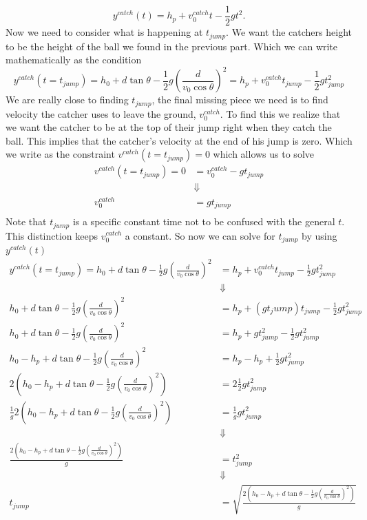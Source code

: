 \documentclass[11pt]{article}
\begin{document}
\begin{equation}
y^{catch}(t) = h_p + v^{catch}_0t - \frac{1}{2}gt^2.
\label{YCatch}
\end{equation}
Now we need to consider what is happening at $t_{jump}$. We want the catchers height to be 
the height of the ball we found in the previous part. Which we can write mathematically as 
the condition
$$y^{catch}(t=t_{jump}) = h_0 + d\tan\theta - \frac{1}{2}g\left(\frac{d}{v_0\cos\theta}\right)^2  = h_p + v^{catch}_0t_{jump} - \frac{1}{2}gt_{jump}^2$$
We are really close to finding $t_{jump}$, the final missing piece we need is to find 
velocity the catcher uses to leave the ground, $v^{catch}_0$. To find this we realize that 
we want the catcher to be at the top of their jump right when they catch the ball. This 
implies that the catcher's velocity at the end of his jump is zero. Which we write as the 
constraint $v^{catch}(t=t_{jump}) = 0$ which allows us to solve
\begin{align*}
v^{catch}(t=t_{jump}) = 0 &= v^{catch}_0 - gt_{jump}\\
&\Downarrow\\
v^{catch}_0 &= gt_{jump}\\
\end{align*}
Note that $t_{jump}$ is a specific constant time not to be confused with the general $t$. 
This distinction keeps $v^{catch}_0$ a constant. So now we can solve for $t_{jump}$ by 
using $y^{catch}(t)$
\begin{align*}
y^{catch}(t=t_{jump}) = h_0 + d\tan\theta - \frac{1}{2}g\left(\frac{d}{v_0\cos\theta}\right)^2  &= h_p + v^{catch}_0t_{jump} - \frac{1}{2}gt_{jump}^2\\
&\Downarrow\\
h_0 + d\tan\theta - \frac{1}{2}g\left(\frac{d}{v_0\cos\theta}\right)^2  &= h_p + (gt_jump)t_{jump} - \frac{1}{2}gt_{jump}^2\\
h_0 + d\tan\theta - \frac{1}{2}g\left(\frac{d}{v_0\cos\theta}\right)^2  &= h_p + gt_{jump}^2 - \frac{1}{2}gt_{jump}^2\\
h_0 - h_p + d\tan\theta - \frac{1}{2}g\left(\frac{d}{v_0\cos\theta}\right)^2  &= h_p - h_p + \frac{1}{2}gt_{jump}^2\\
2\left(h_0 - h_p + d\tan\theta - \frac{1}{2}g\left(\frac{d}{v_0\cos\theta}\right)^2\right)  &= 2\frac{1}{2}gt_{jump}^2\\
\frac{1}{g}2\left(h_0 - h_p + d\tan\theta - \frac{1}{2}g\left(\frac{d}{v_0\cos\theta}\right)^2\right)  &= \frac{1}{g}gt_{jump}^2\\
&\Downarrow\\
\frac{2\left(h_0 - h_p + d\tan\theta - \frac{1}{2}g\left(\frac{d}{v_0\cos\theta}\right)^2\right)}{g}  &= t_{jump}^2\\
&\Downarrow\\
t_{jump} &= \sqrt{\frac{2\left(h_0 - h_p + d\tan\theta - \frac{1}{2}g\left(\frac{d}{v_0\cos\theta}\right)^2\right)}{g}}
\end{align*}
\end{document}

